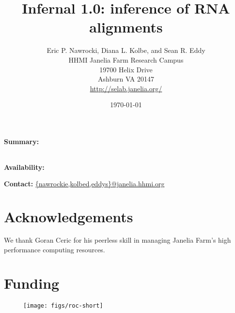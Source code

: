 \documentclass[11pt]{article}
\begin{document}
\title{Infernal 1.0: inference of RNA alignments}
\author{Eric P. Nawrocki, Diana L. Kolbe, and Sean R. Eddy\\
HHMI Janelia Farm Research Campus\\
19700 Helix Drive\\
Ashburn VA 20147\\
\url{http://selab.janelia.org/}\\
}
\date{\today}
\maketitle

\textbf{Summary:}

\\
\textbf{Availability:}


\textbf{Contact:} \url{{nawrockie,kolbed,eddys}@janelia.hhmi.org}






\section{Acknowledgements}
We thank Goran Ceric for his peerless skill in managing Janelia Farm's
high performance computing resources.

\section{Funding}





\newpage

\begin{figure}
\begin{center}
\texttt{[image: figs/roc-short]}

\label{Fig:roc}
\end{center}
\end{figure}

\begin{comment}
\newpage

\begin{table}
\begin{center}

\end{center}

\label{Tab:timings}
\end{table}
\end{comment}
\end{document}
